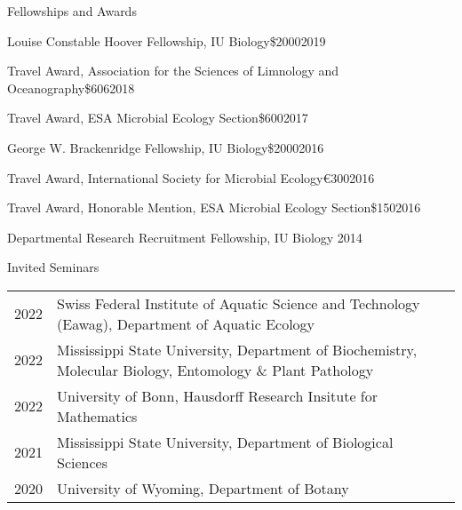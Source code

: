 \documentclass{resume} %
\begin{document}
\begin{rSection}{Fellowships and Awards}

\begin{Award}{Louise Constable Hoover Fellowship, IU Biology}{\$2000}{2019}
\end{Award}

\begin{Award}{Travel Award, Association for the Sciences of Limnology and Oceanography}{\$606}{2018}
\end{Award}

\begin{Award}{Travel Award, ESA Microbial Ecology Section}{\$600}{2017}
\end{Award}

\begin{Award}{George W. Brackenridge Fellowship, IU Biology}{\$2000}{2016}
\end{Award}

\begin{Award}{Travel Award, International Society for Microbial Ecology}{\euro{}300}{2016}
\end{Award}

\begin{Award}{Travel Award, Honorable Mention, ESA Microbial Ecology Section}{\$150}{2016}
\end{Award}

\begin{Award}{Departmental Research Recruitment Fellowship, IU Biology}{ }{2014}
\end{Award}

\end{rSection}

\bigskip
\begin{rSection}{Invited Seminars}
{\def\arraystretch{1}
\begin{tabulary}{\textwidth}{lL}
2022 & Swiss Federal Institute of Aquatic Science and Technology (Eawag), Department of Aquatic Ecology\\

2022 & Mississippi State University, Department of Biochemistry, Molecular Biology, Entomology \& Plant Pathology\\

2022 & University of Bonn, Hausdorff Research Insitute for Mathematics\\

2021 & Mississippi State University, Department of Biological Sciences\\

2020 & University of Wyoming, Department of Botany\\
\end{tabulary}
}
\end{rSection}
\end{document}
